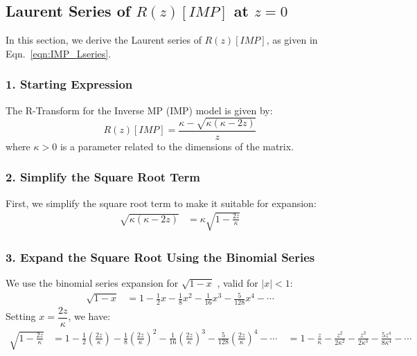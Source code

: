 \subsection{Laurent Series of $R(z)[IMP]$ at $z = 0$}
\label{sxn:IMP}

In this section, we derive the Laurent series of $R(z)[IMP]$, as given in Eqn.~\ref{eqn:IMP_Lseries}.

\subsubsection*{1. Starting Expression}

The R-Transform for the Inverse MP (IMP) model is given by:
\begin{equation}
R(z)[IMP] = \frac{\kappa - \sqrt{\kappa(\kappa - 2z)}}{z}
\end{equation}
where  $\kappa > 0$  is a parameter related to the dimensions of the matrix.

\subsubsection*{2. Simplify the Square Root Term}

First, we simplify the square root term to make it suitable for expansion:
\begin{align}
\sqrt{\kappa(\kappa - 2z)} &= \kappa \sqrt{1 - \frac{2z}{\kappa}}
\end{align}

\subsubsection*{3. Expand the Square Root Using the Binomial Series}

We use the binomial series expansion for  $\sqrt{1 - x}$ , valid for  $|x| < 1$:
\begin{align}
\sqrt{1 - x} &= 1 - \frac{1}{2} x - \frac{1}{8} x^2 - \frac{1}{16} x^3 - \frac{5}{128} x^4 - \cdots
\end{align}
Setting \( x = \dfrac{2z}{\kappa} \), we have:
\begin{align}
\sqrt{1 - \frac{2z}{\kappa}} &= 1 - \frac{1}{2} \left( \frac{2z}{\kappa} \right) - \frac{1}{8} \left( \frac{2z}{\kappa} \right)^2 - \frac{1}{16} \left( \frac{2z}{\kappa} \right)^3 - \frac{5}{128} \left( \frac{2z}{\kappa} \right)^4 - \cdots \
&= 1 - \frac{z}{\kappa} - \frac{z^2}{2\kappa^2} - \frac{z^3}{2\kappa^3} - \frac{5z^4}{8\kappa^4} - \cdots
\end{align}

